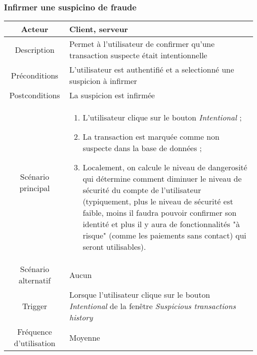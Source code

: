 \documentclass{article}
\begin{document}
\subsubsection{Infirmer une suspicino de fraude}
\begin{table}[h!]

\begin{tabular}{|c|p{11cm}|}
\hline
Acteur & Client, serveur \\
\hline
Description & Permet à l'utilisateur de confirmer qu'une transaction suspecte était intentionnelle \\
\hline
Préconditions & L'utilisateur est authentifié et a selectionné une suspicion à infirmer \\
\hline
Postconditions & La suspicion est infirmée \\
\hline
Scénario principal & \begin{enumerate}
\item L'utilisateur clique sur le bouton \emph{Intentional} ;
\item La transaction est marquée comme non suspecte dans la base de données ;
\item Localement, on calcule le niveau de dangerosité qui détermine comment diminuer le niveau de sécurité du compte de l'utilisateur (typiquement, plus le niveau de sécurité est faible, moins il faudra pouvoir confirmer son identité et plus il y aura de fonctionnalités "à risque" (comme les paiements sans contact) qui seront utilisables).
\end{enumerate} \\
\hline
Scénario alternatif & Aucun \\
\hline
Trigger & Lorsque l'utilisateur clique sur le bouton \emph{Intentional} de la fenêtre  \emph{Suspicious transactions history} \\
\hline
Fréquence d'utilisation & Moyenne \\
\hline
\end{tabular}

\end{table}


\newpage
\end{document}
